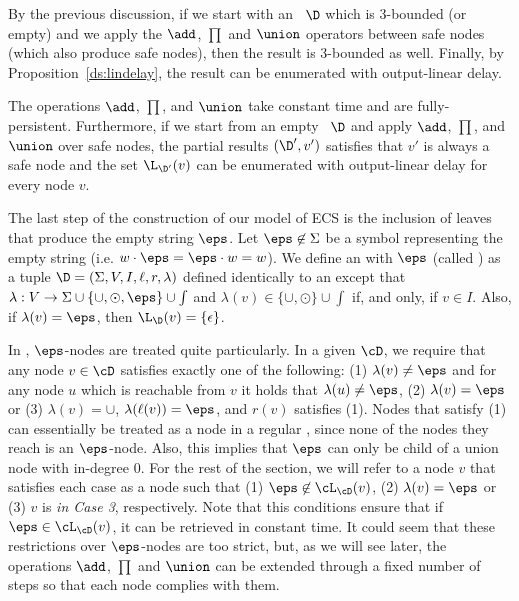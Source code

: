 By the previous discussion, if we start with an \dsabbr\ $\D$ which is 3-bounded (or empty) and we apply the $\add$, $\prod$ and $\union$ operators between safe nodes (which also produce safe nodes), then the result is 3-bounded as well. Finally, by Proposition~\ref{ds:lindelay}, the result can be enumerated with output-linear delay.

\begin{theorem}\label{slps:theo:data-structure}
	The operations $\add$, $\prod$, and $\union$ take constant time and are fully-persistent. Furthermore, if we start from an empty \dsabbr\ $\D$ and apply $\add$, $\prod$, and $\union$ over safe nodes, the partial results $(\D', v')$ satisfies that $v'$ is always a safe node and the set $\L_{\D'}(v)$ can be enumerated with output-linear delay for every node $v$.
\end{theorem}  

The last step of the construction of our model of ECS is the inclusion of leaves that produce the empty string $\eps$. Let $\eps\not\in\Sigma$ be a symbol representing the empty string (i.e. $w\cdot\eps = \eps\cdot w = w$). We define an \dsname{} with $\eps$ (called \dsepsabbr) as a tuple $\D = (\Sigma, V, I, \ell, r, \lambda)$ defined identically to an \dsabbr{} except that $\lambda:V\to\Sigma\cup\{\cup, \odot,\eps\} \cup\int$  and $\lambda(v)\in\{\cup,\odot\}\cup\int$ if, and only, if $v\in I$. Also, if $\lambda(v) = \eps$, then $\L_{\D}(v) = \{\epsilon\}$. 

In \dsepsabbr, $\eps$-nodes are treated quite particularly. 
In a given \dsepsabbr $\cD$, we require that any node $v\in\cD$ satisfies exactly one of the following:
(1) $\lambda(v) \neq \eps$ and for any node $u$ which is reachable from $v$ it holds that $\lambda(u) \neq \eps$, (2) $\lambda(v) = \eps$ or (3) $\lambda(v) = \cup$, $\lambda(\ell(v)) = \eps$, and $r(v)$ satisfies (1). 
Nodes that satisfy (1) can essentially be treated as a node in a regular \dsabbr, since none of the nodes they reach is an $\eps$-node. Also, this implies that $\eps$ can only be child of a union node with in-degree 0.
For the rest of the section, we will refer to a node $v$ that satisfies each case as a node such that (1) $\eps\not\in\cL_{\cD}(v)$, (2) $\lambda(v) = \eps$ or (3) $v$ is {\em in Case 3}, respectively.
Note that this conditions ensure that if $\eps\in\cL_{\cD}(v)$, it can be retrieved in constant time. It could seem that these restrictions over $\eps$-nodes are too strict, but, as we will see later, the operations $\add$, $\prod$ and $\union$ can be extended through a fixed number of steps so that each node complies with them.

